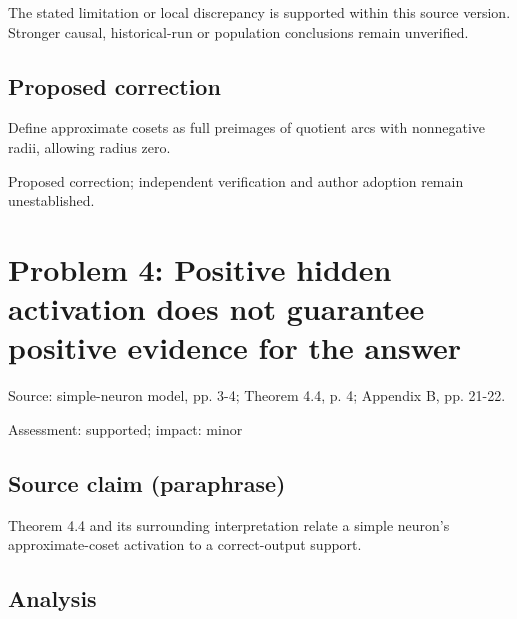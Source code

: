 \documentclass[11pt]{article}
\begin{document}
The stated limitation or local discrepancy is supported within this source version. Stronger causal, historical-run or population conclusions remain unverified.

\subsection*{Proposed correction}

Define approximate cosets as full preimages of quotient arcs with nonnegative radii, allowing radius zero.

Proposed correction; independent verification and author adoption remain unestablished.

\section*{Problem 4: Positive hidden activation does not guarantee positive evidence for the answer}

Source: simple-neuron model, pp. 3-4; Theorem 4.4, p. 4; Appendix B, pp. 21-22.

Assessment: supported; impact: minor

\subsection*{Source claim (paraphrase)}

Theorem 4.4 and its surrounding interpretation relate a simple neuron's approximate-coset activation to a correct-output support.

\subsection*{Analysis}
\end{document}
